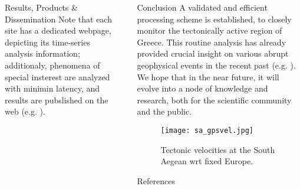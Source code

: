 \documentclass[final,a0,portrait]{beamer}
\newlength{\sepwid}
\newlength{\onecolwid}
\begin{document}
\begin{frame}[t]
\begin{columns}[t]
\begin{column}{\onecolwid}
\begin{block}{Results, Products \& Dissemination}
{Note that each site has a dedicated webpage, depicting its time-series analysis information; additionaly, 
phenomena of special insterest are analyzed with minimin latency, and results are pubslished on the web
(e.g. \cite{dsokep}).
}
\end{block}


\end{column} %

\begin{column}{\sepwid}\end{column} %


\begin{column}{\onecolwid} %


\begin{block}{Conclusion}
{\small
A validated and efficient processing scheme is established, to closely monitor the tectonically active region of Greece. 
This routine analysis has already provided crucial insight on various abrupt geophysical events in the recent past 
(e.g. \cite{GRL:GRL50066}). We hope that in the near future, it will evolve into a node of knowledge and research, 
both for the scientific community and the public.
}
\begin{figure}
    \texttt{[image: sa\_gpsvel.jpg]}
    \caption{Tectonic velocities at the South Aegean wrt fixed Europe.}
    \label{fig:vels}
\end{figure}
\end{block}


\begin{block}{References}

\nocite{*} %
\footnotesize{
\vspace{0.75in}}

\end{block}


\end{column}
\end{columns}
\end{frame}
\end{document}

